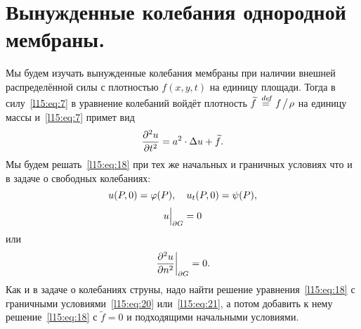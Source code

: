 \section{Вынужденные колебания однородной мембраны.}
\label{lecture15section2}
Мы будем изучать вынужденные колебания мембраны при наличии внешней распределённой силы с плотностью $f(x,y,t)$ на единицу площади. Тогда в силу~\eqref{l15:eq:7} в уравнение колебаний войдёт плотность $\widetilde{f}\stackrel{\hspace{0.09 cm}de\!f}{=} f\!\bigm/\!\rho$ на единицу массы и~\eqref{l15:eq:7} примет вид
\begin{equation}\label{l15:eq:18}
	\hfill\pdder{u}{t}=a^2\cdot\Delta u+\widetilde{f}.\hfill
\end{equation}
Мы будем решать~\eqref{l15:eq:18} при тех же начальных и граничных условиях что и в задаче о свободных колебаниях:
\begin{equation}\label{l15:eq:19}
	\hfill u(P,0)=\phi(P),\quad u_t(P,0)=\psi(P),\hfill
\end{equation} 
\begin{equation}\label{l15:eq:20}
	\hfill u\Big|_{\partial G}=0\hfill
\end{equation} 
или
\begin{equation}\label{l15:eq:21}
	\hfill \left. \pdder{u}{n}\right|_{\partial G}=0.\hfill
\end{equation} 
Как и в задаче о колебаниях струны, надо найти решение уравнения~\eqref{l15:eq:18} с граничными условиями~\eqref{l15:eq:20} или~\eqref{l15:eq:21}, а потом добавить к нему решение~\eqref{l15:eq:18} с $\widetilde{f}=0$ и подходящими начальными условиями.


